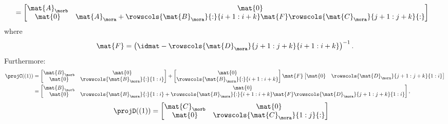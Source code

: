{\begin{example}
\begin{equation*}
\begin{aligned}
                            & =\begin{bmatrix}\mat{A}_\morb & \mat{0}                                                                                         \\
               \mat{0}       & \mat{A}_\mora + \rowscols{\mat{B}_\mora}{:}{i+1:i+k}\mat{F}\rowscols{\mat{C}_\mora}{j+1:j+k}{:}
                               \end{bmatrix}
            \end{aligned}
        \end{equation*}
        where
        \begin{equation*}
            \mat{F}=\left(\idmat - \rowscols{\mat{D}_\mora}{j+1:j+k}{i+1:i+k}\right)^{-1}.
        \end{equation*}
        Furthermore:
        \begin{equation*}
            \begin{aligned}
                \projC((1)) & =\begin{bmatrix} \mat{B}_\morb&\mat{0}\\ \mat{0}&\rowscols{\mat{B}_\mora}{:}{1:i}\end{bmatrix}
                + \begin{bmatrix} \mat{0}\\ \rowscols{\mat{B}_\mora}{:}{i+1:i+k} \end{bmatrix}\mat{F}\begin{bmatrix} \mat{0}&\rowscols{\mat{D}_\mora}{j+1:j+k}{1:i}\end{bmatrix} \\
                            & =\begin{bmatrix}
                                   \mat{B}_\morb & \mat{0}                                                                                                             \\
                                   \mat{0}       & \rowscols{\mat{B}_\mora}{:}{1:i}+ \rowscols{\mat{B}_\mora}{:}{i+1:i+k}\mat{F}\rowscols{\mat{D}_\mora}{j+1:j+k}{1:i}
                               \end{bmatrix},
            \end{aligned}
        \end{equation*}
        \begin{equation*}
            \begin{aligned}
                \projD((1)) & =\begin{bmatrix} \mat{C}_\morb&\mat{0}\\ \mat{0}&\rowscols{\mat{C}_\mora}{1:j}{:}\end{bmatrix}

\end{aligned}
\end{equation*}
\end{example}}
